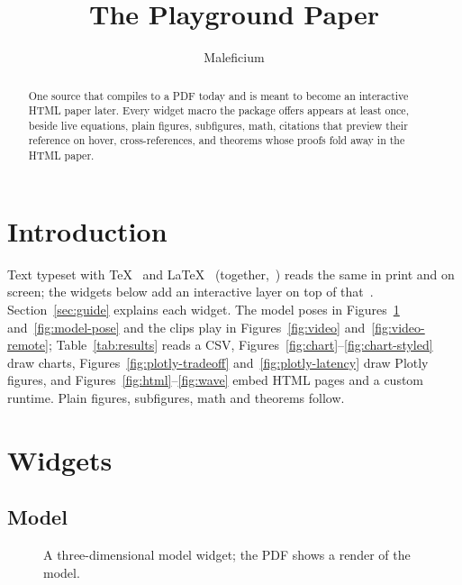 \documentclass{article}
\title{The Playground Paper}
\author{Maleficium}
\date{}
\theoremstyle{definition}
\begin{document}
\maketitle
\begin{abstract}
One source that compiles to a PDF today and is meant to become an
interactive HTML paper later. Every widget macro the package offers
appears at least once, beside live equations, plain figures, subfigures, math,
citations that preview their reference on hover, cross-references, and
theorems whose proofs fold away in the HTML paper.
\end{abstract}

\section{Introduction}
Text typeset with \TeX{}~\cite{knuth1984texbook} and \LaTeX{}~\cite{lamport1994latex}
(together,~\cite{knuth1984texbook,lamport1994latex}) reads the same in print and on screen; the widgets below add an
interactive layer on top of that~\cite{shannon1948mathematical}.
Section~\ref{sec:guide} explains each widget. The model poses in
Figures~\ref{fig:model} and~\ref{fig:model-pose} and the clips play in
Figures~\ref{fig:video} and~\ref{fig:video-remote}; Table~\ref{tab:results}
reads a CSV, Figures~\ref{fig:chart}--\ref{fig:chart-styled} draw charts,
Figures~\ref{fig:plotly-tradeoff} and~\ref{fig:plotly-latency} draw Plotly
figures, and Figures~\ref{fig:html}--\ref{fig:wave} embed HTML pages and a
custom runtime. Plain figures, subfigures, math and theorems follow.

\section{Widgets}\label{sec:widgets}

\subsection{Model}
\begin{figure}[ht]
\centering
\caption{A three-dimensional model widget; the PDF shows a render of the model.}
\label{fig:model}
\end{figure}
\end{document}
